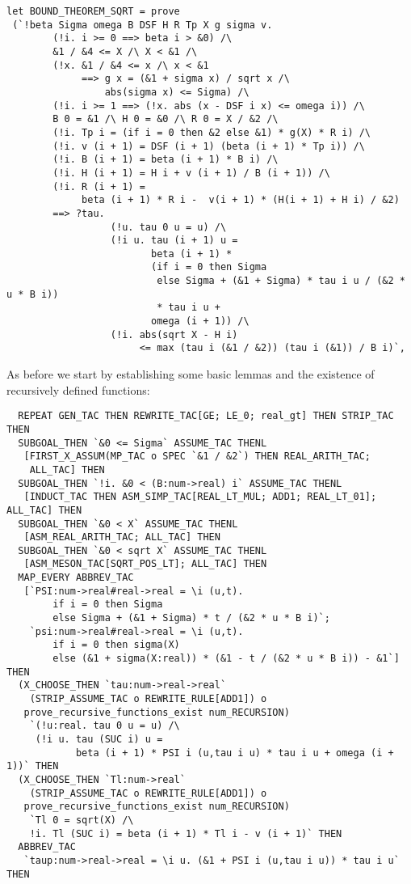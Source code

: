 \documentclass[10pt]{article}
\theoremstyle{definition}
\theoremstyle{remark}
\numberwithin{equation}{section}
\begin{document}
\begin{scriptsize}\begin{verbatim}
let BOUND_THEOREM_SQRT = prove
 (`!beta Sigma omega B DSF H R Tp X g sigma v.
        (!i. i >= 0 ==> beta i > &0) /\
        &1 / &4 <= X /\ X < &1 /\
        (!x. &1 / &4 <= x /\ x < &1
             ==> g x = (&1 + sigma x) / sqrt x /\
                 abs(sigma x) <= Sigma) /\
        (!i. i >= 1 ==> (!x. abs (x - DSF i x) <= omega i)) /\
        B 0 = &1 /\ H 0 = &0 /\ R 0 = X / &2 /\
        (!i. Tp i = (if i = 0 then &2 else &1) * g(X) * R i) /\
        (!i. v (i + 1) = DSF (i + 1) (beta (i + 1) * Tp i)) /\
        (!i. B (i + 1) = beta (i + 1) * B i) /\
        (!i. H (i + 1) = H i + v (i + 1) / B (i + 1)) /\
        (!i. R (i + 1) =
             beta (i + 1) * R i -  v(i + 1) * (H(i + 1) + H i) / &2)
        ==> ?tau.
                  (!u. tau 0 u = u) /\
                  (!i u. tau (i + 1) u =
                         beta (i + 1) *
                         (if i = 0 then Sigma
                          else Sigma + (&1 + Sigma) * tau i u / (&2 * u * B i))
                          * tau i u +
                         omega (i + 1)) /\
                  (!i. abs(sqrt X - H i)
                       <= max (tau i (&1 / &2)) (tau i (&1)) / B i)`,
\end{verbatim}\end{scriptsize}

As before we start by establishing some basic lemmas and the existence of
recursively defined functions:

\begin{scriptsize}\begin{verbatim}
  REPEAT GEN_TAC THEN REWRITE_TAC[GE; LE_0; real_gt] THEN STRIP_TAC THEN
  SUBGOAL_THEN `&0 <= Sigma` ASSUME_TAC THENL
   [FIRST_X_ASSUM(MP_TAC o SPEC `&1 / &2`) THEN REAL_ARITH_TAC;
    ALL_TAC] THEN
  SUBGOAL_THEN `!i. &0 < (B:num->real) i` ASSUME_TAC THENL
   [INDUCT_TAC THEN ASM_SIMP_TAC[REAL_LT_MUL; ADD1; REAL_LT_01]; ALL_TAC] THEN
  SUBGOAL_THEN `&0 < X` ASSUME_TAC THENL
   [ASM_REAL_ARITH_TAC; ALL_TAC] THEN
  SUBGOAL_THEN `&0 < sqrt X` ASSUME_TAC THENL
   [ASM_MESON_TAC[SQRT_POS_LT]; ALL_TAC] THEN
  MAP_EVERY ABBREV_TAC
   [`PSI:num->real#real->real = \i (u,t).
        if i = 0 then Sigma
        else Sigma + (&1 + Sigma) * t / (&2 * u * B i)`;
    `psi:num->real#real->real = \i (u,t).
        if i = 0 then sigma(X)
        else (&1 + sigma(X:real)) * (&1 - t / (&2 * u * B i)) - &1`] THEN
  (X_CHOOSE_THEN `tau:num->real->real`
    (STRIP_ASSUME_TAC o REWRITE_RULE[ADD1]) o
   prove_recursive_functions_exist num_RECURSION)
    `(!u:real. tau 0 u = u) /\
     (!i u. tau (SUC i) u =
            beta (i + 1) * PSI i (u,tau i u) * tau i u + omega (i + 1))` THEN
  (X_CHOOSE_THEN `Tl:num->real`
    (STRIP_ASSUME_TAC o REWRITE_RULE[ADD1]) o
   prove_recursive_functions_exist num_RECURSION)
    `Tl 0 = sqrt(X) /\
    !i. Tl (SUC i) = beta (i + 1) * Tl i - v (i + 1)` THEN
  ABBREV_TAC
   `taup:num->real->real = \i u. (&1 + PSI i (u,tau i u)) * tau i u` THEN
\end{verbatim}\end{scriptsize}
\end{document}
